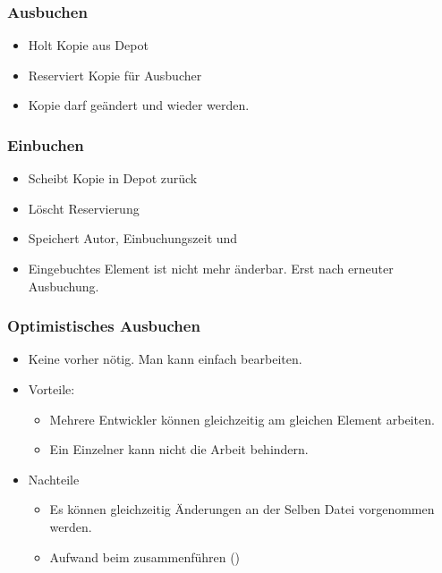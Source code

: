 \subsubsection{Ausbuchen}
\begin{itemize}
    \item Holt Kopie aus Depot
    \item Reserviert Kopie für Ausbucher
    \item Kopie darf geändert und wieder  werden.
\end{itemize}
\subsubsection{Einbuchen}
\begin{itemize}
    \item Scheibt Kopie in Depot zurück
    \item Löscht Reservierung
    \item Speichert Autor, Einbuchungszeit und 
    \item Eingebuchtes Element ist nicht mehr änderbar. Erst nach erneuter Ausbuchung.
\end{itemize}

\subsubsection{Optimistisches Ausbuchen}
\begin{itemize}
    \item Keine  vorher nötig. Man kann einfach bearbeiten.
    \item Vorteile: \begin{itemize}
        \item Mehrere Entwickler können gleichzeitig am gleichen Element arbeiten.
        \item Ein Einzelner kann nicht die Arbeit behindern.
    \end{itemize}
    \item Nachteile \begin{itemize}
        \item Es können gleichzeitig Änderungen an der Selben Datei vorgenommen werden.
        \item Aufwand beim zusammenführen ()
    \end{itemize}
\end{itemize}

